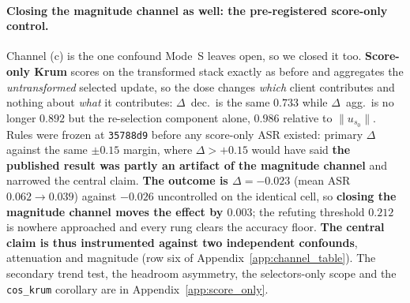 \documentclass{article}
\begin{document}
\paragraph{Closing the magnitude channel as well: the pre-registered score-only control.} Channel (c) is the one confound Mode~S leaves open, so we closed it too. \textbf{Score-only Krum} scores on the transformed stack exactly as before and aggregates the \emph{untransformed} selected update, so the dose changes \emph{which} client contributes and nothing about \emph{what} it contributes: $\Delta$~dec.\ is the same $0.733$ while $\Delta$~agg.\ is no longer $0.892$ but the re-selection component alone, $0.986$ relative to $\|u_{s_0}\|$. Rules were frozen at \texttt{35788d9} before any score-only ASR existed: primary $\Delta$ against the same $\pm0.15$ margin, where $\Delta > +0.15$ would have said \textbf{the published result was partly an artifact of the magnitude channel} and narrowed the central claim. \textbf{The outcome is $\Delta = -0.023$} (mean ASR $0.062 \to 0.039$) against $-0.026$ uncontrolled on the identical cell, so \textbf{closing the magnitude channel moves the effect by $0.003$}; the refuting threshold $0.212$ is nowhere approached and every rung clears the accuracy floor. \textbf{The central claim is thus instrumented against two independent confounds}, attenuation and magnitude (row six of Appendix~\ref{app:channel_table}). The secondary trend test, the headroom asymmetry, the selectors-only scope and the \texttt{cos\_krum} corollary are in Appendix~\ref{app:score_only}.
\end{document}
